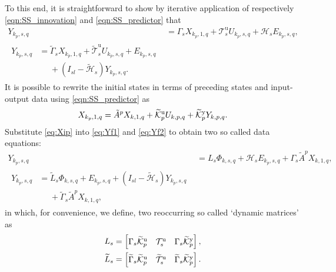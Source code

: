 To this end, it is straightforward to show by iterative application of respectively \eqref{eqn:SS_innovation} and \eqref{eqn:SS_predictor} that%
\begin{align}
    Y_{k_p,s,q} &= \Gamma_s X_{k_p,1,q} + \mathcal{T}_s^\mathrm{u} U_{k_p,s,q} + \mathcal{H}_s E_{k_p,s,q}\label{eq:Yf1},\\
    \begin{split}%
    Y_{k_p,s,q} &= \widetilde{\Gamma}_s X_{k_p,1,q} + \widetilde{\mathcal{T}}_s^\mathrm{u} U_{k_p,s,q} + E_{k_p,s,q}\\
    &\phantom{=}+(I_{sl}-\widetilde{\mathcal{H}}_s)Y_{k_p,s,q}.
    \end{split}\label{eq:Yf2}
\end{align}
It is possible to rewrite the initial states in terms of preceding states and input-output data using \eqref{eqn:SS_predictor} as%
\begin{align}\label{eq:Xip}
    X_{k_p,1,q} = \tilde{A}^p X_{k,1,q} + \widetilde{\mathcal{K}}_{p}^{\mathrm{{u}}} U_{k,p,q} + \widetilde{\mathcal{K}}_{p}^{\mathrm{{y}}} Y_{k,p,q}.
\end{align}
Substitute \eqref{eq:Xip} into \eqref{eq:Yf1} and \eqref{eq:Yf2} %
to obtain two so called data equations:
\begin{align}
    Y_{k_p,s,q} &= L_s \Phi_{k,s,q} + \mathcal{H}_s E_{k_p,s,q} + \Gamma_s \tilde{A}^p X_{k,1,q},\label{eq:DataEq1}\\
    \begin{split}
    Y_{k_p,s,q} &= \widetilde{L}_s \Phi_{k,s,q} + E_{k_p,s,q} + (I_{sl}-\widetilde{\mathcal{H}}_s) Y_{k_p,s,q} \\
    &\phantom{=}+ \widetilde{\Gamma}_s \tilde{A}^p X_{k,1,q},
    \end{split}\label{eq:DataEq2}
\end{align}
in which, for convenience, we define, two reoccurring so called `dynamic matrices' as
\begin{align*}
    L_s &= \begin{bmatrix} \Gamma_s\tKp{u} & \mathcal{T}_s^\mathrm{u} & \Gamma_s\tKp{y} \end{bmatrix},\\%
    \widetilde{L}_s &= \begin{bmatrix} \widetilde{\Gamma}_s\tKp{u} & \widetilde{\mathcal{T}}_s^\mathrm{u} & \widetilde{\Gamma}_s\tKp{y} \end{bmatrix}.
\end{align*}

